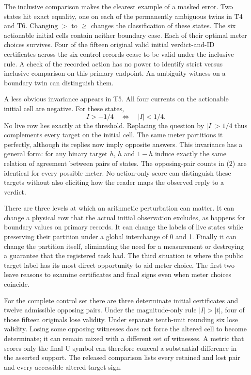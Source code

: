 \documentclass[12pt,letterpaper]{article}
\begin{document}
The inclusive comparison makes the clearest example of a masked error. Two states hit exact equality, one on each of the permanently ambiguous twins in T4 and T6. Changing $>$ to $\ge$ changes the classification of these states. The six actionable initial cells contain neither boundary case. Each of their optimal meter choices survives. Four of the fifteen original valid initial verdict-and-ID certificates across the six control records cease to be valid under the inclusive rule. A check of the recorded action has no power to identify strict versus inclusive comparison on this primary endpoint. An ambiguity witness on a boundary twin can distinguish them.

A less obvious invariance appears in T5. All four currents on the actionable initial cell are negative. For these states,
\[
        I>-1/4 \quad\Longleftrightarrow\quad |I|<1/4 .
\]
No live row lies exactly at the threshold. Replacing the question by $|I|>1/4$ thus complements every target on the initial cell. The same meter partitions it perfectly, although its replies now imply opposite answers. This invariance has a general form: for any binary target $h$, $h$ and $1-h$ induce exactly the same relation of agreement between pairs of states. The opposing-pair counts in (2) are identical for every possible meter. No action-only score can distinguish these targets without also eliciting how the reader maps the observed reply to a verdict.

There are three levels at which an arithmetic perturbation can matter. It can change a physical row that the actual initial observation excludes, as happens for boundary values on primary records. It can change the labels of live states while preserving their partition under a global interchange of 0 and 1. Finally it can change the partition itself, eliminating the need for a measurement or destroying a guarantee that the registered task had. The third situation is where the public target label has its most direct opportunity to aid meter choice. The first two leave reasons to examine certificates and final signs even when meter choices coincide.

For the complete control set there are three determinate initial certificates and twelve admissible opposing pairs. Under the magnitude-only rule $|I|>|t|$, four of those fifteen originals lose validity. Under separate tenth-unit rounding six lose validity. Losing some opposing witnesses does not force the altered cell to become determinate; it can remain mixed with a different set of witnesses. A metric that scores only the final U symbol can therefore conceal a substantial difference in the asserted support. The released comparison lists every retained and lost pair and every accessible altered target sign.
\end{document}
